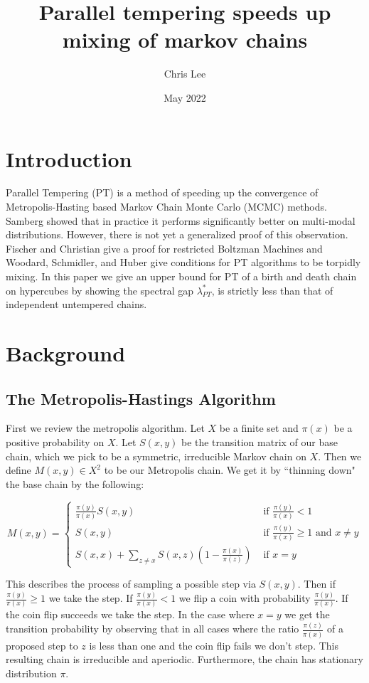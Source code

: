\documentclass{amsart}
\title{Parallel tempering speeds up mixing of markov chains}
\author{Chris Lee}
\date{May 2022}
\newcommand{\1}{\mathbbm{1}}
\begin{document}
\maketitle

\section{Introduction}
Parallel Tempering (PT) is a method of speeding up the convergence of Metropolis-Hasting based Markov Chain Monte Carlo (MCMC) methods. Samberg \cite{samberg} showed that in practice it performs significantly better on multi-modal distributions. However, there is not yet a generalized proof of this observation. Fischer and Christian \cite{FI} give a proof for restricted Boltzman Machines and Woodard, Schmidler, and Huber \cite{WSH} give conditions for PT algorithms to be torpidly mixing. In this paper we give an upper bound for PT of a birth and death chain on hypercubes by showing the spectral gap $\lambda^*_{PT}$, is strictly less than that of independent untempered chains.

\section{Background}
\subsection{The Metropolis-Hastings Algorithm}
First we review the metropolis algorithm. Let $X$ be a finite set and $\pi(x)$ be a positive probability on $X$. Let $S(x,y)$ be the transition matrix of our base chain, which we pick to be a symmetric, irreducible Markov chain on $X$. Then we define $M(x,y)\in X^2$ to be our Metropolis chain. We get it by ``thinning down" the base chain by the following:
    
\begin{equation}
    M(x,y)=\begin{cases}
        \frac{\pi(y)}{\pi(x)}S(x,y)& \text{ if } \frac{\pi(y)}{\pi(x)}<1\\
        S(x,y)& \text{ if } \frac{\pi(y)}{\pi(x)}\geq 1 \text{ and } x\neq y\\
        S(x,x)+\sum_{z\neq x}S(x,z)\left(1-\frac{\pi(x)}{\pi(z)}\right) & \text{ if } x=y
    \end{cases}
\end{equation}

This describes the process of sampling a possible step via $S(x,y)$. Then if $\frac{\pi(y)}{\pi(x)}\geq 1$ we take the step. If $\frac{\pi(y)}{\pi(x)}<1$ we flip a coin with probability $\frac{\pi(y)}{\pi(x)}$. If the coin flip succeeds we take the step. In the case where $x=y$ we get the transition probability by observing that in all cases where the ratio $\frac{\pi(z)}{\pi(x)}$ of a proposed step to $z$ is less than one and the coin flip fails we don't step. This resulting chain is irreducible and aperiodic. Furthermore, the chain has stationary distribution $\pi$.  
\end{document}
